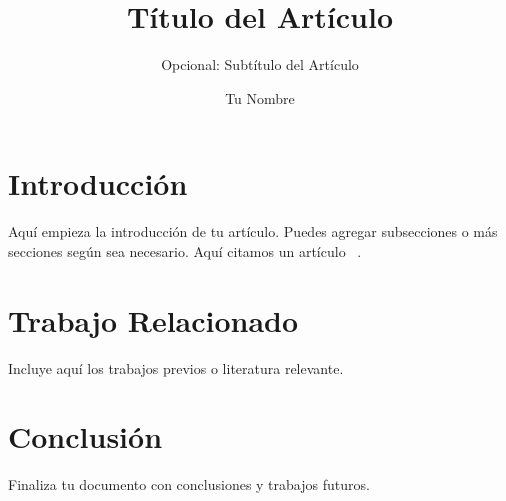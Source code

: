 \documentclass[sigconf]{acmart}
\title{Título del Artículo}
\subtitle{Opcional: Subtítulo del Artículo}
\author{Tu Nombre}
\affiliation{
    \institution{Nombre de tu Institución}
    \city{Ciudad}
    \country{País}
}
\begin{document}
\maketitle

\section{Introducción}
Aquí empieza la introducción de tu artículo. Puedes agregar subsecciones o más secciones según sea necesario.
Aquí citamos un artículo~
\cite{ejemplo}.

\section{Trabajo Relacionado}
Incluye aquí los trabajos previos o literatura relevante.

\section{Conclusión}
Finaliza tu documento con conclusiones y trabajos futuros.



\end{document}
